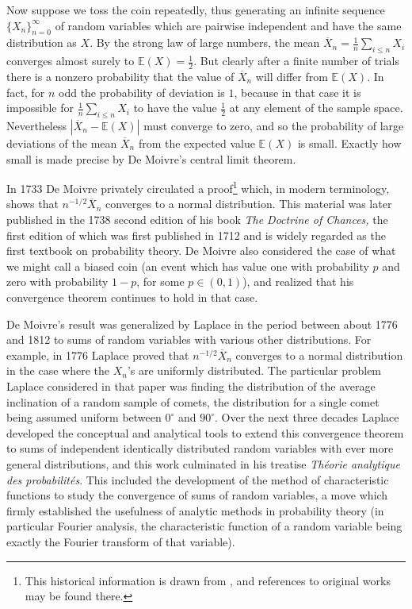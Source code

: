 \documentclass{svjour3}
\begin{document}
Now suppose we toss the coin repeatedly, thus generating an infinite sequence $\{X_n\}_{n =0}^\infty$ of random variables which are pairwise independent and have the same distribution as $X$. By the strong law of large numbers, the mean $\overline X_n = \frac{1}{n} \sum_{i \le n} X_i$ converges almost surely to $\mathbb E(X) = \frac{1}{2}$. But clearly after a finite number of trials there is a nonzero probability that the value of $\overline X_n$ will differ from $\mathbb E(X)$. In fact, for $n$ odd the probability of deviation is $1$, because in that case it is impossible for $\frac{1}{n} \sum_{i \le n} X_i$ to have the value $\frac{1}{2}$ at any element of the sample space. Nevertheless $|\overline X_n - \mathbb E(X)|$ must converge to zero, and so the probability of large deviations of the mean $\overline X_n$ from the expected value $\mathbb E(X)$ is small. Exactly how small is made precise by De Moivre's central limit theorem.

In 1733 De Moivre privately circulated a proof\footnote{This historical information is drawn from \cite{fischer}, and references to original works may be found there.} which, in modern terminology, shows that $n^{-1/2} \overline X_n$ converges to a normal distribution. This material was later published in the 1738 second edition of his book {\em The Doctrine of Chances,} the first edition of which was first published in 1712 and is widely regarded as the first textbook on probability theory. De Moivre also considered the case of what we might call a biased coin (an event which has value one with probability $p$ and zero with probability $1-p$, for some $p \in (0,1)$), and realized that his convergence theorem continues to hold in that case.

De Moivre's result was generalized by Laplace in the period between about 1776 and 1812 to sums of random variables with various other distributions. For example, in 1776 Laplace proved that $n^{-1/2} \overline X_n$ converges to a normal distribution in the case where the $X_n$'s are uniformly distributed. The particular problem Laplace considered in that paper was finding the distribution of the average inclination of a random sample of comets, the distribution for a single comet being assumed uniform between $0^\circ$ and $90^\circ$. Over the next three decades Laplace developed the conceptual and analytical tools to extend this convergence theorem to sums of independent identically distributed random variables with ever more general distributions, and this work culminated in his treatise {\em Th\'eorie analytique des probabilit\'es}. This included the development of the method of characteristic functions to study the convergence of sums of random variables, a move which firmly established the usefulness of analytic methods in probability theory (in particular Fourier analysis, the characteristic function of a random variable being exactly the Fourier transform of that variable).
\end{document}
